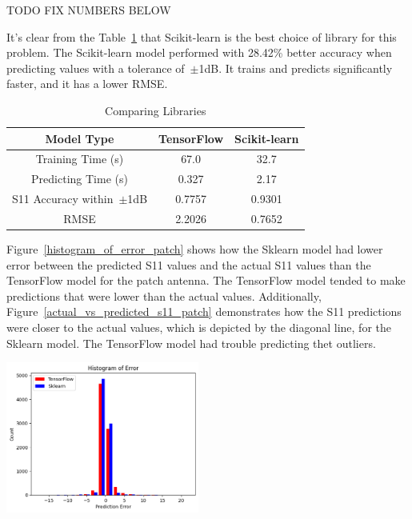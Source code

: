 \documentclass[lettersize,journal]{IEEEtran}
\newenvironment{Figure}
    {\par\medskip\noindent\minipage{\linewidth}}
    {\endminipage\par\medskip}
\begin{document}
TODO FIX NUMBERS BELOW

It's clear from the Table~\ref{comparing_libraries} that Scikit-learn is the best choice of library for this problem. The Scikit-learn model performed with 28.42\% better accuracy when predicting values with a tolerance of~$\pm$1dB. It trains and predicts significantly faster, and it has a lower RMSE.

\begin{table}[h]
\caption{Comparing Libraries}
\begin{center}
\begin{tabular}{ |c|c|c| }
    \hline
    Model Type & TensorFlow & Scikit-learn \\ 
    \hline
    Training Time (s) & 67.0 & 32.7 \\  
    \hline
    Predicting Time (s) & 0.327 & 2.17 \\
    \hline
    S11 Accuracy within~$\pm$1dB & 0.7757 & 0.9301 \\
    \hline
    RMSE & 2.2026 & 0.7652 \\
    \hline
\end{tabular}
\end{center}
\label{comparing_libraries}
\end{table}

Figure~\ref{histogram_of_error_patch} shows how the Sklearn model had lower error between the predicted S11 values and the actual S11 values than the TensorFlow model for the patch antenna. The TensorFlow model tended to make predictions that were lower than the actual values. Additionally, Figure~\ref{actual_vs_predicted_s11_patch} demonstrates how the S11 predictions were closer to the actual values, which is depicted by the diagonal line, for the Sklearn model. The TensorFlow model had trouble predicting thet outliers. 

\begin{Figure}
    \centering
    \includegraphics[width=2.5in]{histogram_patch}
    \label{histogram_of_error_patch}
\end{Figure}
\end{document}
